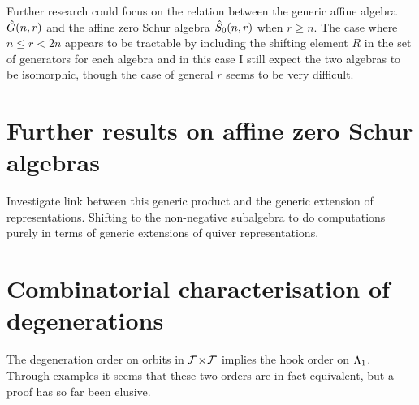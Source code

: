 \documentclass[a4paper, 11pt]{report}
\begin{document}
Further research could focus on the relation between the generic affine algebra $\hat{G}(n,r)$ and the affine zero Schur algebra $\hat{S}_0(n,r)$ when $r\geq n$. The case where $n\le r <2n$ appears to be tractable by including the shifting element $R$ in the set of generators for each algebra and in this case I still expect the two algebras to be isomorphic, though the case of general $r$ seems to be very difficult.


\section{Further results on affine zero Schur algebras}

Investigate link between this generic product and the generic extension of representations. Shifting to the non-negative subalgebra to do computations purely in terms of generic extensions of quiver representations.

\section{Combinatorial characterisation of degenerations}

The degeneration order on orbits in ${\mathcal{F}\!\times\!\mathcal{F}}$ implies the hook order on $\Lambda_1{}$. Through examples it seems that these two orders are in fact equivalent, but a proof has so far been elusive.



\nocite{*}
\printbibliography
\end{document}

